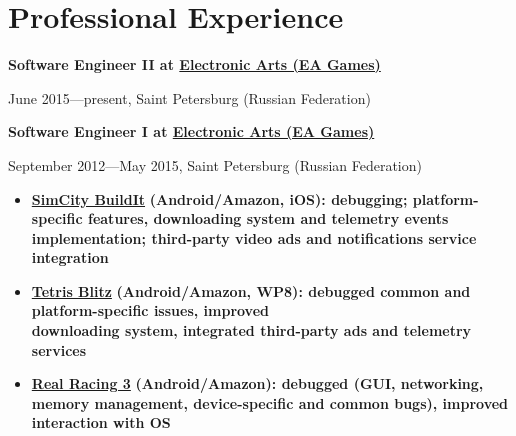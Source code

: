 \section*{Professional Experience}

{
\fontsize{12pt}{12pt}\selectfont
\bfseries Software Engineer II at
\href{http://www.ea.com}{Electronic Arts (EA Games)}
\mdseries
}

{
\fontsize{9pt}{8pt}\selectfont
June 2015---present, Saint Petersburg (Russian Federation)
}


\vspace{0.2cm}

{
\fontsize{12pt}{12pt}\selectfont
\bfseries Software Engineer I at
\href{http://www.ea.com}{Electronic Arts (EA Games)}
\mdseries
}

{
\fontsize{9pt}{8pt}\selectfont
September 2012---May 2015, Saint Petersburg (Russian Federation)
}

\begin{itemize}[rightmargin=\dimexpr\linewidth-18cm-\leftmargin\relax]
\item
    \href{http://www.ea.com/simcity-buildit}
        {\bfseries SimCity BuildIt\mdseries}
        \bfseries (Android/Amazon, iOS)\mdseries:
        debugging;
        platform-specific features,
        downloading system
        and telemetry events implementation;
        third-party video ads and notifications service integration
\item
    \href{http://www.tetrisblitz.com}
        {\bfseries Tetris Blitz\mdseries}
        \bfseries(Android/Amazon, WP8)\mdseries:
        debugged common and platform-specific issues,
        improved \\
        downloading system,
        integrated third-party ads and telemetry services
\item
    \href{http://www.ea.com/real-racing-3}
        {\bfseries Real Racing 3\mdseries}
        \bfseries (Android/Amazon)\mdseries:
        debugged (GUI, networking, memory management, device-specific and common bugs),
        improved interaction with OS
\end{itemize}

